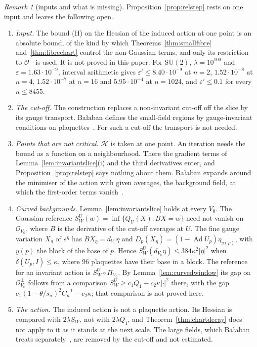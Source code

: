 \documentclass[11pt]{amsart}
\theoremstyle{definition}
\theoremstyle{remark}
\newtheorem{remark}[theorem]{Remark}
\numberwithin{equation}{section}
\newcommand{\SU}{\mathrm{SU}}
\begin{document}
\begin{remark}[inputs and what is missing]\label{rem:relstepinputs}
Proposition~\ref{prop:relstep} rests on one input and leaves the following
open.
\begin{enumerate}[label=\textup{(\alph*)},leftmargin=*]
\item \emph{Input.} The bound (H) on the Hessian of the induced action at
one point is an absolute bound, of the kind by which
Theorems~\ref{thm:smallfibre} and~\ref{thm:fibrechart} control the
non-Gaussian terms, and only its restriction to $\mathcal O^\perp$ is used.
It is not proved in this paper. For $\SU(2)$, $\lambda=10^{100}$ and
$\varepsilon=1.63\cdot10^{-9}$, interval arithmetic gives $\varepsilon'\le
8.40\cdot10^{-9}$ at $n=2$, $1.52\cdot10^{-8}$ at $n=4$, $1.52\cdot
10^{-7}$ at $n=16$ and $5.95\cdot10^{-4}$ at $n=1024$, and $\varepsilon'
\le0.1$ for every $n\le8455$.
\item \emph{The cut-off.} The construction replaces a non-invariant cut-off
off the slice by its gauge transport. Ba{\l}aban defines the small-field
regions by gauge-invariant conditions on
plaquettes~\cite{Bal85a,Bal89b,Dim13}. For such a cut-off the transport is
not needed.
\item \emph{Points that are not critical.} $\mathcal H$ is taken at one
point. An iteration needs the bound as a function on a neighbourhood. There
the gradient terms of Lemma~\ref{lem:invariantslice}(i) and the third
derivatives enter, and Proposition~\ref{prop:relstep} says nothing about
them. Ba{\l}aban expands around the minimiser of the action with given
averages, the background field, at which the first-order terms
vanish~\cite{Bal84a,Dim13}.
\item \emph{Curved backgrounds.} Lemma~\ref{lem:invariantslice} holds at
every $V_0$. The Gaussian reference $S^U_W(w)=\inf\{Q_U(X):BX=w\}$ need not
vanish on $\mathcal O_{V_0}$, where $B$ is the derivative of the cut-off
averages at $U$. The fine gauge variation $X_\eta$ of $e^\eta$ has $BX_\eta=
d_{V_0}\eta$ and $D_p(X_\eta)=(1-\operatorname{Ad}U_p)\eta_{y(p)}$, with
$y(p)$ the block of the base of $p$. Hence $S^U_W(d_{V_0}\eta)\le384
\kappa^2|\eta|^2$ when $\delta(U_p,I)\le\kappa$, where $96$ plaquettes have
their base in a block. The reference for an invariant action is $S^U_W\circ
\Pi_{V_0}$. By Lemma~\ref{lem:curvedwindow} its gap on $\mathcal
O_{V_0}^\perp$ follows from a comparison $S^U_W\ge c_1Q_1-c_2\kappa|\cdot|^2$
there, with the gap $c_1(1-\theta/s_n)^2C_n^{-1}-c_2\kappa$; that comparison
is not proved here.
\item \emph{The action.} The induced action is not a plaquette action. Its
Hessian is compared with $2\lambda S_W$, not with $2\lambda Q_1$, and
Theorem~\ref{thm:chartdecay} does not apply to it as it stands at the next
scale. The large fields, which Ba{\l}aban treats separately~\cite{Bal89b},
are removed by the cut-off and not estimated.
\end{enumerate}
\end{remark}
\end{document}
